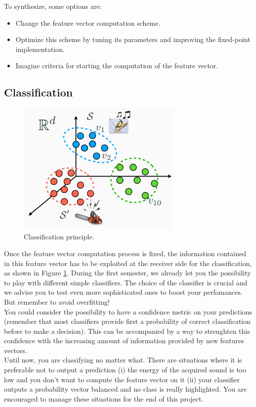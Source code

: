 To synthesize, some options are:
\begin{itemize}
    \item Change the feature vector computation scheme.
    \item Optimize this scheme by tuning its parameters and improving the
    fixed-point implementation.
    \item Imagine criteria for starting the computation of the feature vector.
\end{itemize}
%
\subsection{Classification}

\begin{figure}[H]
    \centering
    \includegraphics[width=8cm]{figs/classification.PNG}
    \caption{Classification principle.}
    \label{fig: classification}
\end{figure}
Once the feature vector computation process is fixed, the information contained in this feature vector has to be exploited at the receiver side for the classification, as shown in Figure \ref{fig: classification}. During the first semester, we already let you the possibility to play with different simple classifiers. The choice of the classifier is crucial and we advise you to test even more sophisticated ones to boost your perfomances. But remember to avoid overfitting! \\ 
You could consider the possibility to have a confidence metric on your predictions (remember that most classifiers provide first a probability of correct classification before to make a decision). This can be accompanied by a way to strenghten this confidence with the increasing amount of information provided by new features vectors. \\
Until now, you are classifying no matter what. There are situations where it is preferable not to output a prediction (i) the energy of the acquired sound is too low and you don't want to compute the feature vector on it (ii) your classifier outputs a probability vector balanced and no class is really highlighted. You are encouraged to manage these situations for the end of this project. 



